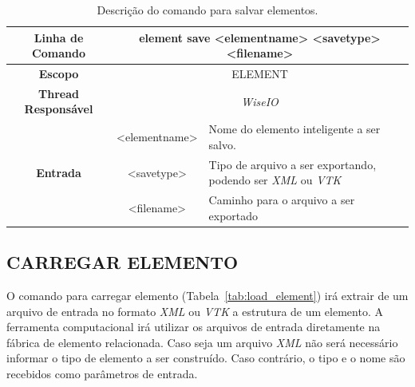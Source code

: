 \begin{center}
	\begin{table}[!htbp]
		\begin{tabularx}{\textwidth}{c|c|X}
			\toprule
			\textbf{Linha de Comando} & \multicolumn{2}{c}{element save <element\underline{\space\space}name> <save\underline{\space\space}type> <filename>} \\
			\midrule
			\textbf{Escopo} & \multicolumn{2}{c}{ELEMENT} \\
			\hline
			\textbf{Thread Responsável} & \multicolumn{2}{c}{\textit{WiseIO}} \\
			\hline
			\multirow{3}{*}{\textbf{Entrada}} & <element\underline{\space\space}name> & Nome do elemento inteligente a ser salvo. \\
			& <save\underline{\space\space}type> & Tipo de arquivo a ser exportando, podendo ser \textit{XML} ou \textit{VTK} \\
			& <filename> & Caminho para o arquivo a ser exportado \\
			\bottomrule
		\end{tabularx}
		\caption{Descrição do comando para salvar elementos.}
		\label{tab:save_element}
	\end{table}
\end{center}

\subsection{CARREGAR ELEMENTO}\label{sec:load_element}

O comando para carregar elemento (Tabela~\ref{tab:load_element}) irá extrair de um arquivo de entrada no formato \textit{XML} ou \textit{VTK} a estrutura de um elemento. A ferramenta computacional irá utilizar os arquivos de entrada diretamente na fábrica de elemento relacionada. Caso seja um arquivo \textit{XML} não será necessário informar o tipo de elemento a ser construído. Caso contrário, o tipo e o nome são recebidos como parâmetros de entrada.

